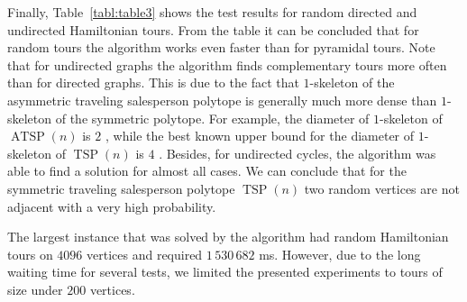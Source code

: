 \documentclass[runningheads]{llncs}
\DeclareMathOperator\TSP {TSP}
\DeclareMathOperator\ATSP {ATSP}
\begin{document}
Finally, Table~\ref{tabl:table3} shows the test results for random directed and undirected Hamiltonian tours. From the table it can be concluded that for random tours the algorithm works even faster than for pyramidal tours.
Note that for undirected graphs the algorithm finds complementary tours more often than for directed graphs. This is due to the fact that $1$-skeleton of the asymmetric traveling salesperson polytope is generally much more dense than $1$-skeleton of the symmetric polytope. For example, the diameter of $1$-skeleton of $\ATSP(n)$ is $2$ \cite{Padberg}, while the best known upper bound for the diameter of $1$-skeleton of $\TSP(n)$ is $4$ \cite{Rispoli}.
Besides, for undirected cycles, the algorithm was able to find a solution for almost all cases. 
We can conclude that for the symmetric traveling salesperson polytope $\TSP(n)$ two random vertices are not adjacent with a very high probability. %


The largest instance that was solved by the algorithm had random Hamiltonian tours on $4096$ vertices and required $1\,530\,682$ ms.
However, due to the long waiting time for several tests, we limited the presented experiments to tours of size under $200$ vertices.
\end{document}

